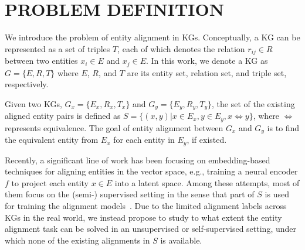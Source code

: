 







\section{PROBLEM DEFINITION}
We introduce the problem of entity alignment in KGs. 
Conceptually, a KG can be represented as a set of triples $T$, each of which denotes the relation $r_{ij}\in R$ between two entities $x_i\in E$ and $x_j\in E$. 
In this work, we denote a KG as $G=\{E,R,T\}$ where $E$, $R$, and $T$ are its entity set, relation set, and triple set, respectively. 


Given two KGs, $G_x = \{E_x,R_x,T_x\}$ and $G_y = \{E_y,R_y,T_y\}$, the set of the existing aligned entity pairs is defined as $S = \{(x,y)|x\in E_x, y \in E_y, x\Leftrightarrow y\}$, where $\Leftrightarrow$ represents equivalence. 
The goal of entity alignment between $G_x$ and $G_y$ is to find the equivalent entity from $E_x$ for each entity in $E_y$, if existed.


 Recently, a significant line of work has been focusing on embedding-based techniques for aligning entities in the vector space, e.g., training a neural encoder $f$ to project each entity $x \in E$ into a latent space. 
Among these attempts, most of them focus on the (semi-) supervised setting in the sense that part of $S$ is used for training the alignment models~\cite{MTransE,GCN-Align,CEAFF,tang2019bert-int,wu2019relation}. 
Due to the limited alignment labels across KGs in the real world, we instead propose to study to what extent the entity alignment task can be solved in an unsupervised or self-supervised setting, under which none of the existing alignments in $S$ is available. 

 




